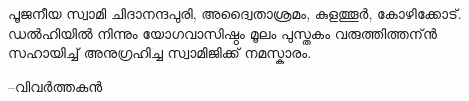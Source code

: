 \newpage
{}

പൂജനീയ സ്വാമി ചിദാനന്ദപുരി, അദ്വൈതാശ്രമം, കുളത്തൂര്‍, കോഴിക്കോട്.
ഡല്‍ഹിയില്‍ നിന്നും യോഗവാസിഷ്ഠം മൂലം പുസ്തകം വരുത്തിത്തന്ന്‍ സഹായിച്ച് അനുഗ്രഹിച്ച സ്വാമിജിക്ക് നമസ്കാരം. 
                                              
--വിവര്‍ത്തകന്‍  
